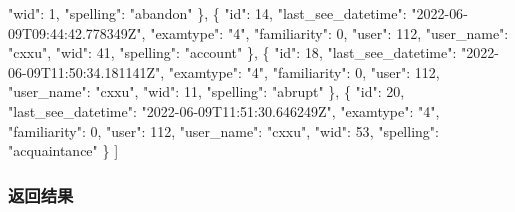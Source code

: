 \documentclass[
]{article}
\newenvironment{Shaded}{}{}
\newcommand{\DataTypeTok}[1]{\textcolor[rgb]{0.56,0.13,0.00}{#1}}
\newcommand{\DecValTok}[1]{\textcolor[rgb]{0.25,0.63,0.44}{#1}}
\newcommand{\FunctionTok}[1]{\textcolor[rgb]{0.02,0.16,0.49}{#1}}
\newcommand{\OtherTok}[1]{\textcolor[rgb]{0.00,0.44,0.13}{#1}}
\newcommand{\StringTok}[1]{\textcolor[rgb]{0.25,0.44,0.63}{#1}}
\begin{document}
\begin{Shaded}
\begin{Highlighting}[]
    \DataTypeTok{"wid"}\FunctionTok{:} \DecValTok{1}\FunctionTok{,}
    \DataTypeTok{"spelling"}\FunctionTok{:} \StringTok{"abandon"}
  \FunctionTok{\}}\OtherTok{,}
  \FunctionTok{\{}
    \DataTypeTok{"id"}\FunctionTok{:} \DecValTok{14}\FunctionTok{,}
    \DataTypeTok{"last\_see\_datetime"}\FunctionTok{:} \StringTok{"2022{-}06{-}09T09:44:42.778349Z"}\FunctionTok{,}
    \DataTypeTok{"examtype"}\FunctionTok{:} \StringTok{"4"}\FunctionTok{,}
    \DataTypeTok{"familiarity"}\FunctionTok{:} \DecValTok{0}\FunctionTok{,}
    \DataTypeTok{"user"}\FunctionTok{:} \DecValTok{112}\FunctionTok{,}
    \DataTypeTok{"user\_name"}\FunctionTok{:} \StringTok{"cxxu"}\FunctionTok{,}
    \DataTypeTok{"wid"}\FunctionTok{:} \DecValTok{41}\FunctionTok{,}
    \DataTypeTok{"spelling"}\FunctionTok{:} \StringTok{"account"}
  \FunctionTok{\}}\OtherTok{,}
  \FunctionTok{\{}
    \DataTypeTok{"id"}\FunctionTok{:} \DecValTok{18}\FunctionTok{,}
    \DataTypeTok{"last\_see\_datetime"}\FunctionTok{:} \StringTok{"2022{-}06{-}09T11:50:34.181141Z"}\FunctionTok{,}
    \DataTypeTok{"examtype"}\FunctionTok{:} \StringTok{"4"}\FunctionTok{,}
    \DataTypeTok{"familiarity"}\FunctionTok{:} \DecValTok{0}\FunctionTok{,}
    \DataTypeTok{"user"}\FunctionTok{:} \DecValTok{112}\FunctionTok{,}
    \DataTypeTok{"user\_name"}\FunctionTok{:} \StringTok{"cxxu"}\FunctionTok{,}
    \DataTypeTok{"wid"}\FunctionTok{:} \DecValTok{11}\FunctionTok{,}
    \DataTypeTok{"spelling"}\FunctionTok{:} \StringTok{"abrupt"}
  \FunctionTok{\}}\OtherTok{,}
  \FunctionTok{\{}
    \DataTypeTok{"id"}\FunctionTok{:} \DecValTok{20}\FunctionTok{,}
    \DataTypeTok{"last\_see\_datetime"}\FunctionTok{:} \StringTok{"2022{-}06{-}09T11:51:30.646249Z"}\FunctionTok{,}
    \DataTypeTok{"examtype"}\FunctionTok{:} \StringTok{"4"}\FunctionTok{,}
    \DataTypeTok{"familiarity"}\FunctionTok{:} \DecValTok{0}\FunctionTok{,}
    \DataTypeTok{"user"}\FunctionTok{:} \DecValTok{112}\FunctionTok{,}
    \DataTypeTok{"user\_name"}\FunctionTok{:} \StringTok{"cxxu"}\FunctionTok{,}
    \DataTypeTok{"wid"}\FunctionTok{:} \DecValTok{53}\FunctionTok{,}
    \DataTypeTok{"spelling"}\FunctionTok{:} \StringTok{"acquaintance"}
  \FunctionTok{\}}
\OtherTok{]}
\end{Highlighting}
\end{Shaded}

\hypertarget{ux8fd4ux56deux7ed3ux679c-45}{%
\subsubsection{返回结果}\label{ux8fd4ux56deux7ed3ux679c-45}}
\end{document}

